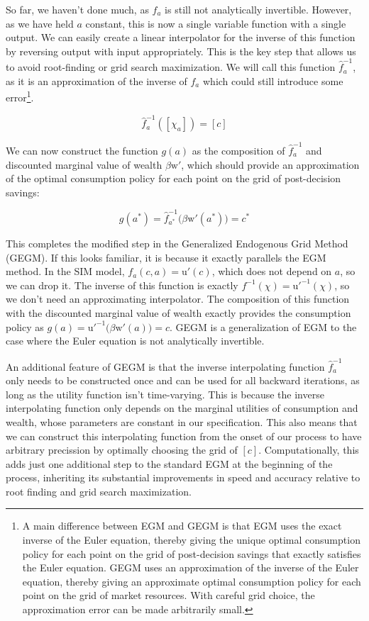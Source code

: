 \documentclass{article}
\newcommand{\DiscFac}{\beta}
\newcommand{\uFunc}{\mathrm{u}}
\newcommand{\aNrm}{a}
\newcommand{\cNrm}{c}
\newcommand{\wFunc}{\mathrm{w}}
\newcommand{\xFer}{\chi}
\begin{document}
So far, we haven't done much, as $f_a$ is still not analytically invertible. However, as we have held $\aNrm$ constant, this is now a single variable function with a single output. We can easily create a linear interpolator for the inverse of this function by reversing output with input appropriately. This is the key step that allows us to avoid root-finding or grid search maximization. We will call this function $\hat{f}_{a}^{ -1}$, as it is an approximation of the inverse of $f_{a}$ which could still introduce some error\footnote{A main difference between EGM and GEGM is that EGM uses the exact inverse of the Euler equation, thereby giving the unique optimal consumption policy for each point on the grid of post-decision savings that exactly satisfies the Euler equation. GEGM uses an approximation of the inverse of the Euler equation, thereby giving an approximate optimal consumption policy for each point on the grid of market resources. With careful grid choice, the approximation error can be made arbitrarily small.}.

\begin{equation}
\hat{f}_{a}^{-1}([\xFer_{a}]) = [\cNrm]
\end{equation}

We can now construct the function $g(\aNrm)$ as the composition of $\hat{f}_{a}^{ -1}$ and discounted marginal value of wealth $\DiscFac \wFunc'$, which should provide an approximation of the optimal consumption policy for each point on the grid of post-decision savings:

\begin{equation}
g(\aNrm^*) = \hat{f}_{a^*}^{-1} \big( \DiscFac \wFunc'(\aNrm^*) \big) = \cNrm^*
\end{equation}

This completes the modified step in the Generalized Endogenous Grid Method (GEGM). If this looks familiar, it is because it exactly parallels the EGM method. In the SIM model, $f_a(\cNrm,\aNrm) = \uFunc'(\cNrm)$, which does not depend on $\aNrm$, so we can drop it. The inverse of this function is exactly $f^{ -1}(\xFer) = \uFunc'^{ -1}(\xFer)$, so we don't need an approximating interpolator. The composition of this function with the discounted marginal value of wealth  exactly  provides  the consumption policy as $g(\aNrm) = \uFunc'^{ -1} \big( \DiscFac \wFunc'(\aNrm) \big) = \cNrm$. GEGM is a generalization of EGM to the case where the Euler equation is not analytically invertible.

An additional feature of GEGM is that the inverse interpolating function $\hat{f}_{a}^{ -1}$ only needs to be constructed once and can be used for all backward iterations, as long as the utility function isn't time-varying. This is because the inverse interpolating function only depends on the marginal utilities of consumption and wealth, whose parameters are constant in our specification. This also means that we can construct this interpolating function from the onset of our process to have arbitrary precission by optimally choosing the grid of $[\cNrm]$. Computationally, this adds just one additional step to the standard EGM at the beginning of the process, inheriting its substantial improvements in speed and accuracy relative to root finding and grid search maximization.
\end{document}
